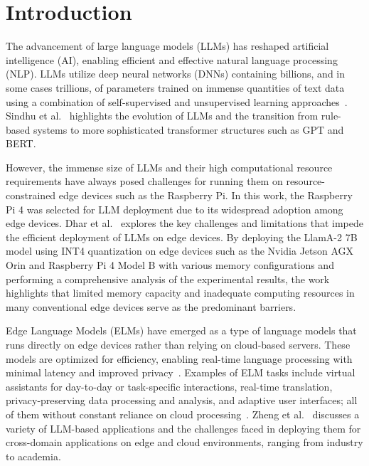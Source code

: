 
\section{Introduction}

The advancement of large language models (LLMs) has reshaped artificial intelligence (AI), enabling efficient and effective natural language processing (NLP). 
LLMs utilize deep neural networks (DNNs) containing billions, and in some cases trillions, of parameters trained on immense quantities of text data using a combination of self-supervised and unsupervised learning approaches~\cite{01}. 
Sindhu et al.~\cite{02} highlights the evolution of LLMs and the transition from rule-based systems to more sophisticated transformer structures such as GPT and BERT. 

However, the immense size of LLMs and their high computational resource requirements have always posed challenges for running them on resource-constrained edge devices such as the Raspberry Pi. 
In this work, the Raspberry Pi 4 was selected for LLM deployment due to its widespread adoption among edge devices. 
Dhar et al.~\cite{03} explores the key challenges and limitations that impede the efficient deployment of LLMs on edge devices. By deploying the LlamA-2 7B model using INT4 quantization on edge devices such as the Nvidia Jetson AGX Orin and Raspberry Pi 4 Model B with various memory configurations and performing a comprehensive analysis of the experimental results, the work highlights that limited memory capacity and inadequate computing resources in many conventional edge devices serve as the predominant barriers. 

Edge Language Models (ELMs) have emerged as a type of language models that runs directly on edge devices rather than relying on cloud-based servers. These models are optimized for efficiency, enabling real-time language processing with minimal latency and improved privacy~\cite{haris_SECDA-LLM_2024}. 
Examples of ELM tasks include virtual assistants for day-to-day or task-specific interactions, real-time translation, privacy-preserving data processing and analysis, and adaptive user interfaces; all of them without constant reliance on cloud processing~\cite{05}. 
Zheng et al.~\cite{06} discusses a variety of LLM-based applications and the challenges faced in deploying them for cross-domain applications on edge and cloud environments, ranging from industry to academia. 


